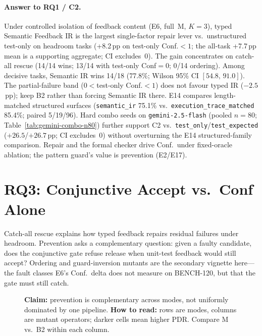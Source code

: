 \paragraph{Answer to RQ1 / C2.}
Under controlled isolation of feedback content (E6, full~M, $K{=}3$), typed
Semantic Feedback IR is the largest single-factor repair lever vs.\
unstructured test-only on headroom tasks (+8.2\,pp on test-only Conf.${<}1$;
the all-task +7.7\,pp mean is a supporting aggregate; CI excludes~0).
The gain concentrates on catch-all rescue (14/14 wins; 13/14 with test-only
Conf${=}0$; 0/14 ordering).
Among decisive tasks, Semantic IR wins 14/18 (77.8\%; Wilson 95\% CI
$[54.8,\,91.0]$).
The partial-failure band ($0{<}$test-only Conf.${<}1$) does not favour typed
IR (${-}2.5$\,pp); keep B2 rather than forcing Semantic IR there.
E14 compares length-matched structured surfaces
(\texttt{semantic\_ir} 75.1\% vs.\
\texttt{execution\_trace\_matched} 85.4\%; paired 5/19/96).
Hard combo seeds on \texttt{gemini-2.5-flash} (pooled $n{=}80$;
Table~\ref{tab:gemini-combo-n80}) further support C2 vs.\
\texttt{test\_only}/\texttt{test\_expected} (${+}26.5$/${+}26.7$\,pp;
CI excludes~0) without overturning the E14 structured-family comparison.
Repair and the formal checker drive Conf.\ under fixed-oracle ablation; the
pattern guard's value is prevention (E2/E17).

\section{RQ3: Conjunctive Accept vs.\ Conf Alone}
\label{sec:results:rq3}

Catch-all rescue explains how typed feedback repairs residual failures under
headroom.
Prevention asks a complementary question: given a faulty candidate, does the
conjunctive gate refuse release when unit-test feedback would still accept?
Ordering and guard-inversion mutants are the secondary vignette here---the
fault classes E6's Conf.\ delta does not measure on BENCH-120, but that the
gate must still catch.

\begin{figure}[t]
  \centering
  \caption{\textbf{Claim:} prevention is complementary across modes, not
    uniformly dominated by one pipeline.
    \textbf{How to read:} rows are modes, columns are mutant operators; darker
    cells mean higher PDR.  Compare M vs.\ B2 within each column.}
  \label{fig:prevention-heatmap}
\end{figure}

